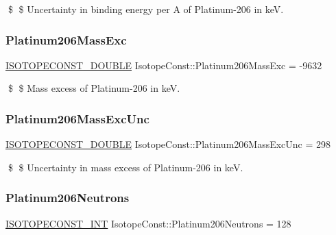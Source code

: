 \$ \$ Uncertainty in binding energy per A of Platinum-\/206 in keV. \mbox{\label{group___isotope_const-_platinum-_pt206_ga37bec9eaf202f3d1e3d76d12766b9ffb}} 
\subsubsection{\texorpdfstring{Platinum206\+Mass\+Exc}{Platinum206MassExc}}
{\footnotesize\ttfamily \mbox{\hyperlink{group___isotope_const-_macros_ga8f45a7272ce02c0b4c65c44636ed719a}{I\+S\+O\+T\+O\+P\+E\+C\+O\+N\+S\+T\+\_\+\+D\+O\+U\+B\+LE}} Isotope\+Const\+::\+Platinum206\+Mass\+Exc = -\/9632}

\$ \$ Mass excess of Platinum-\/206 in keV. \mbox{\label{group___isotope_const-_platinum-_pt206_ga97a11d8018edf5105cf885460727778b}} 
\subsubsection{\texorpdfstring{Platinum206\+Mass\+Exc\+Unc}{Platinum206MassExcUnc}}
{\footnotesize\ttfamily \mbox{\hyperlink{group___isotope_const-_macros_ga8f45a7272ce02c0b4c65c44636ed719a}{I\+S\+O\+T\+O\+P\+E\+C\+O\+N\+S\+T\+\_\+\+D\+O\+U\+B\+LE}} Isotope\+Const\+::\+Platinum206\+Mass\+Exc\+Unc = 298}

\$ \$ Uncertainty in mass excess of Platinum-\/206 in keV. \mbox{\label{group___isotope_const-_platinum-_pt206_ga39e9ab7da255dbfc938ec09910815ee5}} 
\subsubsection{\texorpdfstring{Platinum206\+Neutrons}{Platinum206Neutrons}}
{\footnotesize\ttfamily \mbox{\hyperlink{group___isotope_const-_macros_ga5f18360b3e99483a35c32d789e62621c}{I\+S\+O\+T\+O\+P\+E\+C\+O\+N\+S\+T\+\_\+\+I\+NT}} Isotope\+Const\+::\+Platinum206\+Neutrons = 128}

